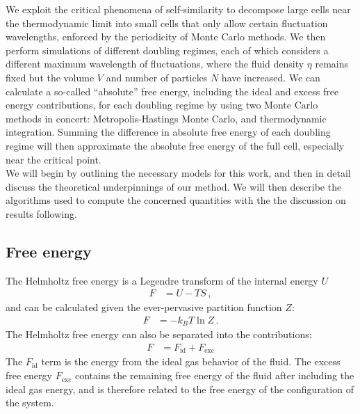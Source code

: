 \documentclass[12pt]{article}
\begin{document}
We exploit the critical phenomena of self-similarity to decompose large cells near the thermodynamic limit into small cells that only allow certain fluctuation wavelengths, enforced by the periodicity of Monte Carlo methods. We then perform simulations of different doubling regimes, each of which considers a different maximum wavelength of fluctuations, where the fluid density $\eta$ remains fixed but the volume $V$ and number of particles $N$ have increased. We can calculate a so-called ``absolute'' free energy, including the ideal and excess free energy contributions, for each doubling regime by using two Monte Carlo methods in concert: Metropolis-Hastings Monte Carlo, and thermodynamic integration. Summing the difference in absolute free energy of each doubling regime will then approximate the absolute free energy of the full cell, especially near the critical point. \\

We will begin by outlining the necessary models for this work, and then in detail discuss the theoretical underpinnings of our method. We will then describe the algorithms used to compute the concerned quantities with the the discussion on results following. 

\subsection{Free energy}
The Helmholtz free energy is a Legendre transform of the internal energy $U$
\begin{align}
    F &= U - TS\, ,
    \label{Fdef}
\end{align}
and can be calculated given the ever-pervasive partition function $Z$:
\begin{align}
    F &= -k_B T \ln Z\, .
    \label{FdefSM}
\end{align}
The Helmholtz free energy can also be separated into the contributions:
\begin{align}
    F &= F_{\text{id}} + F_{\text{exc}}
    \label{F_abs}
\end{align} 
The $F_{\text{id}}$ term is the energy from the ideal gas behavior of the fluid. The excess free energy $F_{\text{exc}}$ contains the remaining free energy of the fluid after including the ideal gas energy, and is therefore related to the free energy of the configuration of the system.\\
\end{document}
